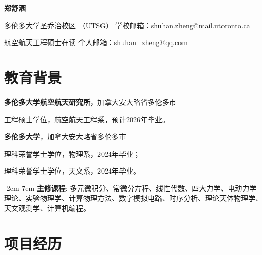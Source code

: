 \documentclass{article}
\begin{document}

\begin{center}
  \Huge{\textbf{郑舒涵}}
\end{center}

\noindent 多伦多大学圣乔治校区 （UTSG） \hfill 学校邮箱：shuhan.zheng@mail.utoronto.ca

\noindent 航空航天工程硕士在读 \hfill 个人邮箱：shuhan\_zheng@qq.com

\setlength{\parskip}{3pt}

\section{教育背景}
\indent

\hspace{2em}\textbf{多伦多大学航空航天研究所}，加拿大安大略省多伦多市

\hspace{4em}工程硕士学位，航空航天工程系，预计2026年毕业。

\hspace{2em}\textbf{多伦多大学}，加拿大安大略省多伦多市

\hspace{4em}理科荣誉学士学位，物理系，2024年毕业；

\hspace{4em}理科荣誉学士学位，天文系，2024年毕业。


{\parindent -2em
\leftskip 7em
\textbf{主修课程}: 多元微积分、常微分方程、线性代数、四大力学、电动力学理论、实验物理学、计算物理方法、数字模拟电路、时序分析、理论天体物理学、天文观测学、计算机编程。
\par}

\section{项目经历}
\indent
\end{document}
